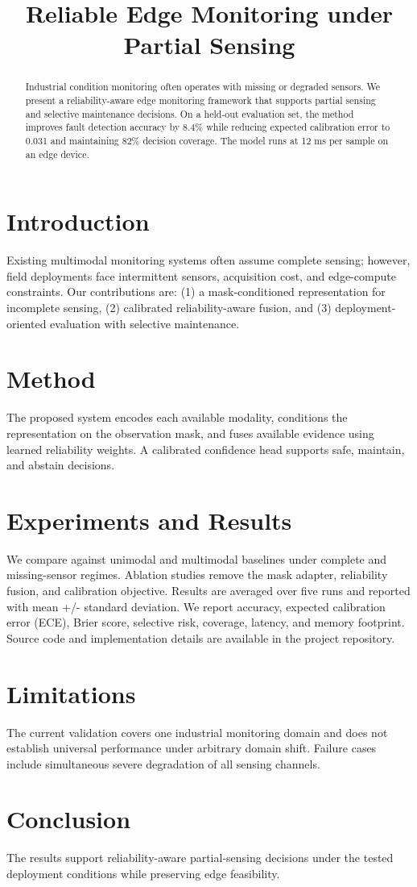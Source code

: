 \documentclass{article}
\title{Reliable Edge Monitoring under Partial Sensing}
\begin{document}
\maketitle
\begin{abstract}
Industrial condition monitoring often operates with missing or degraded sensors. We present a reliability-aware edge monitoring framework that supports partial sensing and selective maintenance decisions. On a held-out evaluation set, the method improves fault detection accuracy by 8.4\% while reducing expected calibration error to 0.031 and maintaining 82\% decision coverage. The model runs at 12 ms per sample on an edge device.
\end{abstract}

\section{Introduction}
Existing multimodal monitoring systems often assume complete sensing; however, field deployments face intermittent sensors, acquisition cost, and edge-compute constraints. Our contributions are: (1) a mask-conditioned representation for incomplete sensing, (2) calibrated reliability-aware fusion, and (3) deployment-oriented evaluation with selective maintenance.

\section{Method}
The proposed system encodes each available modality, conditions the representation on the observation mask, and fuses available evidence using learned reliability weights. A calibrated confidence head supports safe, maintain, and abstain decisions.

\section{Experiments and Results}
We compare against unimodal and multimodal baselines under complete and missing-sensor regimes. Ablation studies remove the mask adapter, reliability fusion, and calibration objective. Results are averaged over five runs and reported with mean +/- standard deviation. We report accuracy, expected calibration error (ECE), Brier score, selective risk, coverage, latency, and memory footprint. Source code and implementation details are available in the project repository.

\section{Limitations}
The current validation covers one industrial monitoring domain and does not establish universal performance under arbitrary domain shift. Failure cases include simultaneous severe degradation of all sensing channels.

\section{Conclusion}
The results support reliability-aware partial-sensing decisions under the tested deployment conditions while preserving edge feasibility.
\end{document}
